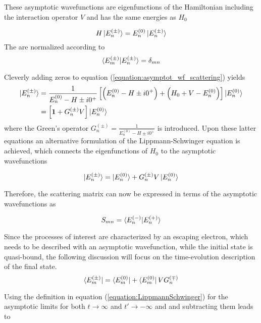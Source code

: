 These asymptotic wavefunctions are eigenfunctions of the Hamiltonian including
the interaction operator $V$ and has the same energies as $H_0$

\begin{equation}
 H \ket{E_n^{(\pm)}} = E_n^{(0)} \ket{E_n^{(\pm)}}
\end{equation}
The are normalized according to
\begin{equation}
 \braket{E_m^{(\pm)} | E_n^{(\pm)}} = \delta_{mn}
\end{equation}

Cleverly adding zeros to equation (\ref{equation:asymptot_wf_scattering})
yields
\begin{align}
 \ket{E_n^{(\pm)}} &= \frac{1}{E_n^{(0)}-H \pm i0^+}
   \left[ \left( E_n^{(0)}-H \pm i0^+ \right) + \left( H_0 + V - E_n^{(0)} \right)
        \right] \ket{E_n^{(0)}}   \\
 &= \left[ \mathbf{1} + G_n^{(\pm)}V \right]  \ket{E_n^{(0)}}
\end{align}
where the Green's operator $G_n^{(\pm)} = \frac{1}{E_n^{(0)}-H \pm i0^+}$ is
introduced. Upon these latter equations an alternative formulation
of the Lippmann-Schwinger equation is achieved, which connects the eigenfunctions
of $H_0$ to the asymptotic wavefunctions

\begin{equation} \label{equation:LippmannSchwinger}
 \ket{E_n^{(\pm)}} =  \ket{E_n^{(0)}} + G_n^{(\pm)}V \ket{E_n^{(0)}}
\end{equation}

Therefore, the scattering matrix can now be expressed in terms of the asymptotic
wavefunctions as

\begin{equation}
 S_{mn} = \braket{E_n^{(-)} | E_n^{(+)}}
\end{equation}

Since the processes of interest are characterized by an escaping electron,
which needs to be described with an asymptotic wavefunction, while the initial
state is quasi-bound, the following discussion will focus on the time-evolution
description of the final state.
\begin{equation}
 \bra{E_m^{(\pm)}} = \bra{E_m^{(0)}} + \bra{E_m^{(0)}} V G_n^{(\mp)}
\end{equation}

Using the definition in equation (\ref{equation:LippmannSchwinger})
for the asymptotic limits for both $t\rightarrow \infty$ and
$t' \rightarrow - \infty$ and and subtracting them leads to 

